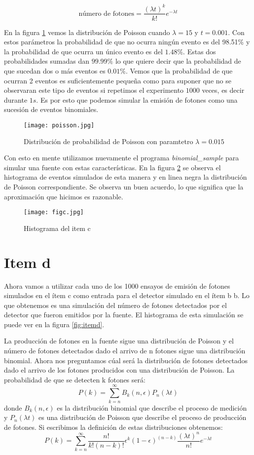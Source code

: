 \documentclass{article}
\begin{document}
$$\text{número\ de\ fotones} = \frac{(\lambda t)^k}{k!} e^{-\lambda t}$$

En la figura \ref{fig:poisson} vemos la distribución de Poisson cuando $\lambda=15$ y $t=0.001$.
Con estos parámetros la probabilidad de que no ocurra ningún evento es del 98.51\% y la probabilidad de que ocurra un único evento es del $1.48\%$.
Estas dos probabilidades sumadas dan $99.99\%$  lo que quiere decir que la probabilidad de que sucedan dos o más eventos es $0.01\%$.
Vemos que la probabilidad de que ocurran 2 eventos es suficientemente pequeña como para suponer que no se observaran este tipo de eventos si repetimos el experimento $1000$ veces, es decir durante $1s$.
Es por esto que podemos simular la emisión de fotones como una sucesión de eventos binomiales.

\begin{figure}
\centering
\texttt{[image: poisson.jpg]}
\caption[]{Distribución de probabilidad de Poisson con paramtetro $\lambda=0.015$}
\label{fig:poisson}
\end{figure}

Con esto en mente utilizamos nuevamente el programa \textit{binomial\_sample} para simular una fuente con estas características.
En la figura \ref{fig:itemc} se observa el histograma de eventos simulados de esta manera y en linea negra la distribución de Poisson correspondiente. Se observa un buen acuerdo, lo que significa que la aproximación que hicimos es razonable.

\begin{figure}
\centering
\texttt{[image: figc.jpg]}
\caption[]{Histograma del item c}
\label{fig:itemc}
\end{figure}

\section{Item d}
Ahora vamos a utilizar cada uno de los 1000 ensayos de emisión de fotones simulados en el ítem c como entrada para el detector simulado en el ítem b b.
Lo que obtenemos es una simulación del número de fotones detectados por el detector que fueron emitidos por la fuente.
El histograma de esta simulación se puede ver en la figura  \ref{fig:itemd}.

La producción de fotones en la fuente sigue una distribución de Poisson y el número de fotones detectados dado el arrivo de n fotones sigue una distribución binomial.
Ahora nos preguntamos cúal será la distribución de fotones detectados dado el arrivo de los fotones producidos con una distribución de Poisson.
La probabilidad de que se detecten k fotones será:
$$
P(k) = \sum_{k=n}^{\infty} B_k(n, \epsilon) P_n(\lambda t)
$$
donde $B_k(n, \epsilon)$ es la distribución binomial que describe el proceso de medición y $P_n(\lambda t)$ es una distribución de Poisson que describe el proceso de producción de fotones.
Si escribimos la definición de estas distribuciones obtenemos:
$$
P(k) = \sum_{k=n}^{\infty} \frac{n!}{k!(n-k)!}\epsilon^k (1- \epsilon)^(n-k) \frac{(\lambda t)^n}{n!}e^{-\lambda t}
$$
\end{document}
